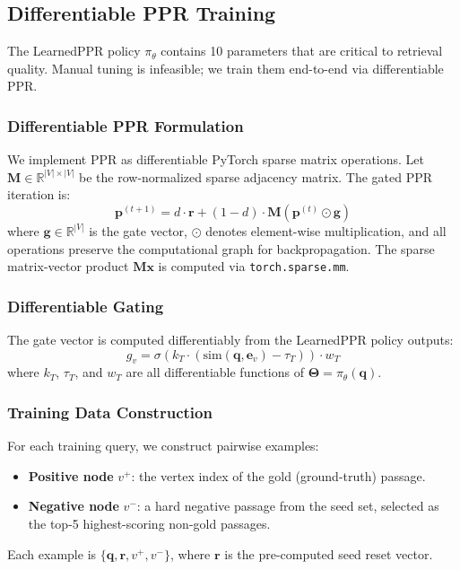\documentclass[conference,a4paper]{IEEEtran}
\newcommand{\bm}[1]{\boldsymbol{#1}}
\newcommand{\sigm}{\sigma}
\begin{document}
\subsection{Differentiable PPR Training}\label{sec:diff_ppr}

The LearnedPPR policy $\pi_\theta$ contains 10 parameters that are critical to retrieval quality. Manual tuning is infeasible; we train them end-to-end via differentiable PPR.

\subsubsection{Differentiable PPR Formulation}
We implement PPR as differentiable PyTorch sparse matrix operations. Let $\mathbf{M} \in \mathbb{R}^{|V| \times |V|}$ be the row-normalized sparse adjacency matrix. The gated PPR iteration is:
\begin{equation}
    \bm{p}^{(t+1)} = d \cdot \bm{r} + (1 - d) \cdot \mathbf{M} (\bm{p}^{(t)} \odot \bm{g})
    \label{eq:diff_ppr}
\end{equation}
where $\bm{g} \in \mathbb{R}^{|V|}$ is the gate vector, $\odot$ denotes element-wise multiplication, and all operations preserve the computational graph for backpropagation. The sparse matrix-vector product $\mathbf{M} \bm{x}$ is computed via \texttt{torch.sparse.mm}.

\subsubsection{Differentiable Gating}
The gate vector is computed differentiably from the LearnedPPR policy outputs:
\begin{equation}
    g_v = \sigm\!\left(k_T \cdot (\text{sim}(\bm{q}, \bm{e}_v) - \tau_T)\right) \cdot w_T
    \label{eq:diff_gate}
\end{equation}
where $k_T$, $\tau_T$, and $w_T$ are all differentiable functions of $\bm{\Theta} = \pi_\theta(\bm{q})$.

\subsubsection{Training Data Construction}
For each training query, we construct pairwise examples:
\begin{itemize}[leftmargin=*, itemsep=1pt]
    \item \textbf{Positive node} $v^+$: the vertex index of the gold (ground-truth) passage.
    \item \textbf{Negative node} $v^-$: a hard negative passage from the seed set, selected as the top-5 highest-scoring non-gold passages.
\end{itemize}
Each example is $\{\bm{q}, \bm{r}, v^+, v^-\}$, where $\bm{r}$ is the pre-computed seed reset vector.
\end{document}
